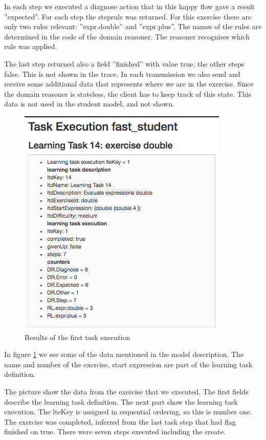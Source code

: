 In each step we executed a diagnose action that in this happy flow gave a result ''expected''. 
For each step the steprule was returned.
For this exercise there are only two rules relevant: ''expr.double'' and ''expr.plus''.
The names of the rules are determined in the code of the domain reasoner.
The reasoner recognises which rule was applied.

The last step returned also a field ''finished'' with value true, the other steps false.
This is not shown in the trace.
In each transmission we also send and receive some additional data that represents where we are in the exercise.
Since the domain reasoner is stateless, the client has to keep track of this state.
This data is not used in the student model, and not shown.

\begin{figure}
\includegraphics[scale=1.0]{pictures/screen03.png}
\caption{Results of the first task execution}
\label{fig:lte01}
\end{figure}

In figure \ref{fig:lte01} we see some of the data mentioned in the model description.
The name and number of the exercise, start expression are part of the learning task definition.

The picture show the data from the exercise that we executed.
The first fields describe the learning task definition.
The next part show the learning task execution.
The lteKey is assigned in sequential ordering, so this is number one.
The exercise was completed, inferred from the last task step that had flag finished on true.
There were seven steps executed including the create.

